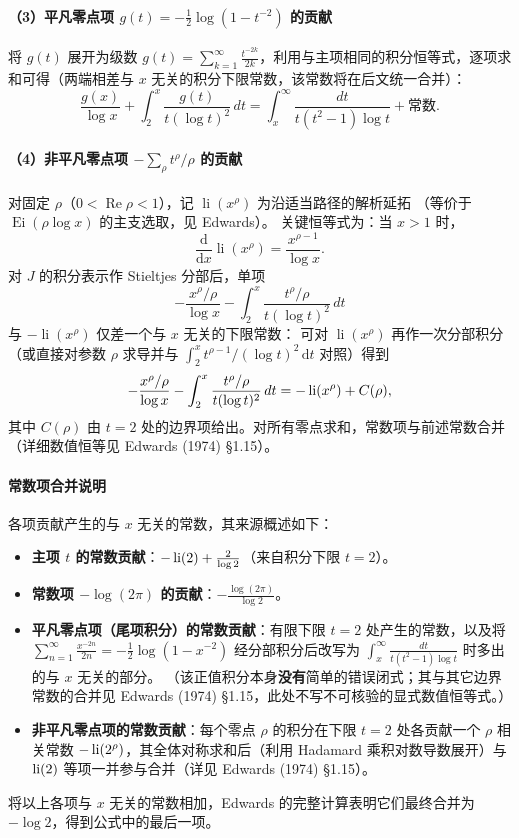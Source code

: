 \paragraph{（3）平凡零点项 \texorpdfstring{$g(t)=-\frac12\log(1-t^{-2})$}{g(t) = -1/2 log(1-t^-2)} 的贡献}
将 $g(t)$ 展开为级数 $g(t)=\sum_{k=1}^\infty \frac{t^{-2k}}{2k}$，利用与主项相同的积分恒等式，逐项求和可得（两端相差与 $x$ 无关的积分下限常数，该常数将在后文统一合并）：
\[
\frac{g(x)}{\log x} + \int_2^x \frac{g(t)}{t(\log t)^2}\, dt
= \int_x^\infty \frac{dt}{t(t^2-1)\log t} + \text{常数}.
\]

\paragraph{（4）非平凡零点项 \texorpdfstring{$-\sum_\rho t^\rho/\rho$}{-sum t^rho / rho} 的贡献}
对固定 $\rho$（$0<\operatorname{Re}\rho<1$），记 $\operatorname{li}(x^\rho)$ 为沿适当路径的解析延拓
（等价于 $\operatorname{Ei}(\rho\log x)$ 的主支选取，见 Edwards）。
关键恒等式为：当 $x>1$ 时，
\[
\frac{\mathrm{d}}{\mathrm{d}x}\operatorname{li}(x^\rho)
=
\frac{x^{\rho-1}}{\log x}.
\]
对 $J$ 的积分表示作 Stieltjes 分部后，单项
\[
-\frac{x^\rho/\rho}{\log x} - \int_2^x \frac{t^\rho/\rho}{t(\log t)^2}\, dt
\]
与 $-\operatorname{li}(x^\rho)$ 仅差一个与 $x$ 无关的下限常数：
可对 $\operatorname{li}(x^\rho)$ 再作一次分部积分（或直接对参数 $\rho$ 求导并与
$\int_2^x t^{\rho-1}/(\log t)^2\,\mathrm{d}t$ 对照）得到
\[
-\frac{x^\rho/\rho}{\log x} - \int_2^x \frac{t^\rho/\rho}{t(\log t)^2}\, dt
= -\operatorname{li}(x^\rho) + C(\rho),
\]
其中 $C(\rho)$ 由 $t=2$ 处的边界项给出。对所有零点求和，常数项与前述常数合并
（详细数值恒等见 Edwards (1974) §1.15）。


\paragraph{常数项合并说明}
各项贡献产生的与 $x$ 无关的常数，其来源概述如下：
\begin{itemize}
  \item \textbf{主项 $t$ 的常数贡献}：$-\operatorname{li}(2) + \frac{2}{\log 2}$（来自积分下限 $t=2$）。
  \item \textbf{常数项 $-\log(2\pi)$ 的贡献}：$-\frac{\log(2\pi)}{\log 2}$。
  \item \textbf{平凡零点项（尾项积分）的常数贡献}：有限下限 $t=2$ 处产生的常数，以及将
  $\sum_{n=1}^{\infty}\frac{x^{-2n}}{2n}=-\frac12\log(1-x^{-2})$
  经分部积分后改写为
  $\int_x^{\infty}\frac{dt}{t(t^2-1)\log t}$ 时多出的与 $x$ 无关的部分。
  （该正值积分本身\textbf{没有}简单的错误闭式；其与其它边界常数的合并见 Edwards (1974) §1.15，此处不写不可核验的显式数值恒等式。）
  \item \textbf{非平凡零点项的常数贡献}：每个零点 $\rho$ 的积分在下限 $t=2$ 处各贡献一个 $\rho$ 相关常数 $-\operatorname{li}(2^\rho)$，其全体对称求和后（利用 Hadamard 乘积对数导数展开）与 $\operatorname{li}(2)$ 等项一并参与合并（详见 Edwards (1974) §1.15）。
\end{itemize}
将以上各项与 $x$ 无关的常数相加，Edwards 的完整计算表明它们最终合并为 $-\log 2$，得到公式中的最后一项。


